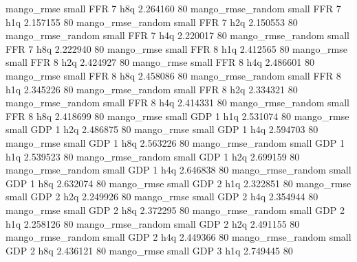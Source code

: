        mango_rmse      small      FFR                 7                  h8q 2.264160 80
mango_rmse_random      small      FFR                 7                  h1q 2.157155 80
mango_rmse_random      small      FFR                 7                  h2q 2.150553 80
mango_rmse_random      small      FFR                 7                  h4q 2.220017 80
mango_rmse_random      small      FFR                 7                  h8q 2.222940 80
       mango_rmse      small      FFR                 8                  h1q 2.412565 80
       mango_rmse      small      FFR                 8                  h2q 2.424927 80
       mango_rmse      small      FFR                 8                  h4q 2.486601 80
       mango_rmse      small      FFR                 8                  h8q 2.458086 80
mango_rmse_random      small      FFR                 8                  h1q 2.345226 80
mango_rmse_random      small      FFR                 8                  h2q 2.334321 80
mango_rmse_random      small      FFR                 8                  h4q 2.414331 80
mango_rmse_random      small      FFR                 8                  h8q 2.418699 80
       mango_rmse      small      GDP                 1                  h1q 2.531074 80
       mango_rmse      small      GDP                 1                  h2q 2.486875 80
       mango_rmse      small      GDP                 1                  h4q 2.594703 80
       mango_rmse      small      GDP                 1                  h8q 2.563226 80
mango_rmse_random      small      GDP                 1                  h1q 2.539523 80
mango_rmse_random      small      GDP                 1                  h2q 2.699159 80
mango_rmse_random      small      GDP                 1                  h4q 2.646838 80
mango_rmse_random      small      GDP                 1                  h8q 2.632074 80
       mango_rmse      small      GDP                 2                  h1q 2.322851 80
       mango_rmse      small      GDP                 2                  h2q 2.249926 80
       mango_rmse      small      GDP                 2                  h4q 2.354944 80
       mango_rmse      small      GDP                 2                  h8q 2.372295 80
mango_rmse_random      small      GDP                 2                  h1q 2.258126 80
mango_rmse_random      small      GDP                 2                  h2q 2.491155 80
mango_rmse_random      small      GDP                 2                  h4q 2.449366 80
mango_rmse_random      small      GDP                 2                  h8q 2.436121 80
       mango_rmse      small      GDP                 3                  h1q 2.749445 80
